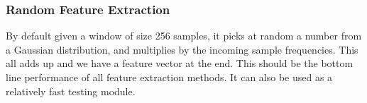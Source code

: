 \subsubsection{Random Feature Extraction}

By default given a window of size 256 samples, it picks
at random a number from a Gaussian distribution, and
multiplies by the incoming sample frequencies.
This all adds up and we have a feature vector at the end.
This should be the bottom line performance of all feature
extraction methods. It can also be used as a relatively fast
testing module.
